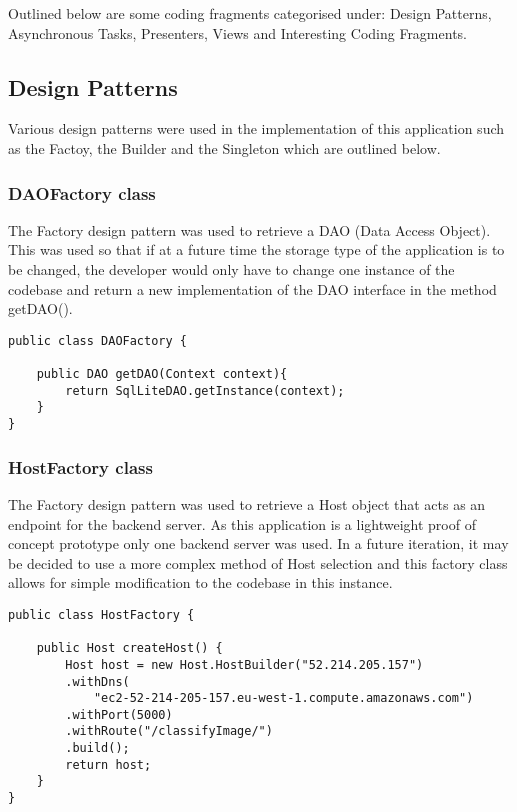 Outlined below are some coding fragments categorised under: Design Patterns, Asynchronous Tasks, Presenters, Views and Interesting Coding Fragments.

\subsection*{Design Patterns}
Various design patterns were used in the implementation of this application such as the Factoy, the Builder and the Singleton which are outlined below.

\subsubsection*{DAOFactory class}
The Factory design pattern was used to retrieve a DAO (Data Access Object).
This was used so that if at a future time the storage type of the application is to be changed, the developer would only have to change one instance of the codebase and return a new implementation of the DAO interface in the method getDAO().
\begin{lstlisting}[style=Java]
public class DAOFactory {

    public DAO getDAO(Context context){
        return SqlLiteDAO.getInstance(context);
    }
}
\end{lstlisting}

\subsubsection*{HostFactory class}
The Factory design pattern was used to retrieve a Host object that acts as an endpoint for the backend server.
As this application is a lightweight proof of concept prototype only one backend server was used.
In a future iteration, it may be decided to use a more complex method of Host selection and this factory class allows for simple modification to the codebase in this instance.
\begin{lstlisting}[style=Java]
public class HostFactory {

    public Host createHost() {
        Host host = new Host.HostBuilder("52.214.205.157")
        .withDns(
            "ec2-52-214-205-157.eu-west-1.compute.amazonaws.com")
        .withPort(5000)
        .withRoute("/classifyImage/")
        .build();
        return host;
    }
}
\end{lstlisting}

